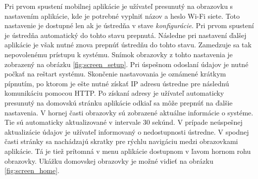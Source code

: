Pri prvom spustení mobilnej aplikácie je užívateľ presunutý na obrazovku s nastavením aplikácie, kde je potrebné vyplniť názov a heslo Wi-Fi siete. Toto nastavenie je dostupné len ak je ústredňa v stave \textit{konfigurácie}. Pri prvom spustení je ústredňa automatický do tohto stavu prepnutá. Následne pri nastavení ďalšej aplikácie je však nutné znova prepnúť ústredňu do tohto stavu. Zamedzuje sa tak nepovolenému prístupu k systému. Snímok obrazovky z tohto nastavenia je zobrazený na obrázku \ref{fig:screen_setup}. Pri úspešnom odoslaní údajov je nutné počkať na reštart systému. Skončenie nastavovania je oznámené krátkym pípnutím, po ktorom je ešte nutné získať IP adresu ústredne pre následnú komunikáciu pomocou HTTP. Po získaní adresy je užívateľ automaticky presunutý na domovskú stránku aplikácie odkiaľ sa môže prepnúť na ďalšie nastavenia. V hornej časti obrazovky sú zobrazené aktuálne informácie o systéme. Tie sú automaticky aktualizované v intervale 30 sekúnd. V prípade neúspešnej aktualizácie údajov je užívateľ informovaný o nedostupnosti ústredne. V spodnej časti stránky sa nachádzajú skratky pre rýchlu navigáciu medzi obrazovkami aplikácie. Tá je tiež prítomná v menu aplikácie dostupnom v ľavom hornom rohu obrazovky. Ukážku domovskej obrazovky je možné vidieť na obrázku \ref{fig:screen_home}.

